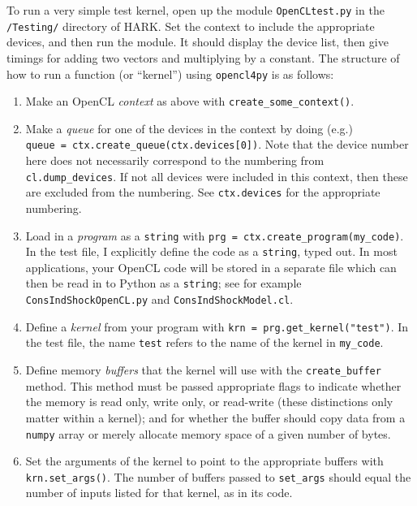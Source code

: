 \documentclass[12pt,pdftex,letterpaper]{article}
\begin{document}
To run a very simple test kernel, open up the module \texttt{OpenCLtest.py} in the \texttt{/Testing/} directory of HARK.  Set the context to include the appropriate devices, and then run the module.  It should display the device list, then give timings for adding two vectors and multiplying by a constant.  The structure of how to run a function (or ``kernel'') using \texttt{opencl4py} is as follows:

\begin{enumerate}
\item Make an OpenCL \textit{context} as above with \texttt{create\_some\_context()}.

\item Make a \textit{queue} for one of the devices in the context by doing (e.g.)\\ \texttt{queue = ctx.create\_queue(ctx.devices[0])}.  Note that the device number here does not necessarily correspond to the numbering from \texttt{cl.dump\_devices}.  If not all devices were included in this context, then these are excluded from the numbering.  See \texttt{ctx.devices} for the appropriate numbering.

\item Load in a \textit{program} as a \texttt{string} with \texttt{prg = ctx.create\_program(my\_code)}.  In the test file, I explicitly define the code as a \texttt{string}, typed out.  In most applications, your OpenCL code will be stored in a separate file which can then be read in to Python as a \texttt{string}; see for example \texttt{ConsIndShockOpenCL.py} and \texttt{ConsIndShockModel.cl}.

\item Define a \textit{kernel} from your program with \texttt{krn = prg.get\_kernel("test")}.  In the test file, the name \texttt{test} refers to the name of the kernel in \texttt{my\_code}.

\item Define memory \textit{buffers} that the kernel will use with the \texttt{create\_buffer} method.  This method must be passed appropriate flags to indicate whether the memory is read only, write only, or read-write (these distinctions only matter within a kernel); and for whether the buffer should copy data from a \texttt{numpy} array or merely allocate memory space of a given number of bytes.

\item Set the arguments of the kernel to point to the appropriate buffers with \texttt{krn.set\_args()}.  The number of buffers passed to \texttt{set\_args} should equal the number of inputs listed for that kernel, as in its code.


\end{enumerate}
\end{document}
